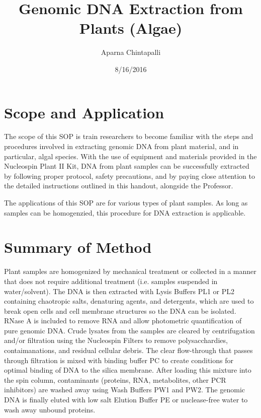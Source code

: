 \documentclass[12pt]{../SOP3_alpha}\usepackage[]{graphicx}\usepackage[]{color}
\title{Genomic DNA Extraction from Plants (Algae)}
\date{8/16/2016}
\author{Aparna Chintapalli}
\begin{document}

\maketitle

\section{Scope and Application}

\NP The scope of this SOP is train researchers to become familiar with the steps and procedures involved in extracting genomic DNA from plant material, and in particular, algal species. With the use of equipment and materials provided in the Nucleospin Plant II Kit, DNA from plant samples can be successfully extracted by following proper protocol, safety precautions, and by paying close attention to the detailed instructions outlined in this handout, alongside the Professor. 

\NP The applications of this SOP are for various types of plant samples. As long as samples can be homogenzied, this procedure for DNA extraction is applicable. 

\section{Summary of Method}

\NP Plant samples are homogenized by mechanical treatment or collected in a manner that does not require additional treatment (i.e. samples suspended in water/solvent). The DNA is then extracted with Lysis Buffers PL1 or PL2 containing chaotropic salts, denaturing agents, and detergents, which are used to break open cells and cell membrane structures so the DNA can be isolated. RNase A is included to remove RNA and allow photometric quantification of pure genomic DNA. Crude lysates from the samples are cleared by centrifugation and/or filtration using the Nucleospin Filters to remove polysacchardies, contaimanations, and residual cellular debris. The clear flow-through that passes through filtration is mixed with binding buffer PC to create conditions for optimal binding of DNA to the silica membrane. After loading this mixture into the spin column, contaminants (proteins, RNA, metabolites, other PCR inhibitors) are washed away using Wash Buffers PW1 and PW2. The genomic DNA is finally eluted with low salt Elution Buffer PE or nuclease-free water to wash away unbound proteins.
\end{document}
